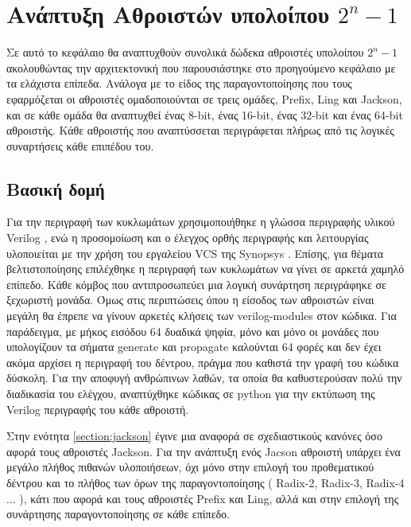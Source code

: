 \section{Ανάπτυξη Αθροιστών υπολοίπου $2^n-1$ }

Σε αυτό το κεφάλαιο θα αναπτυχθούν συνολικά δώδεκα αθροιστές υπολοίπου $2^n-1$
ακολουθώντας την αρχιτεκτονική που παρουσιάστηκε στο προηγούμενο κεφάλαιο 
με τα ελάχιστα επίπεδα. Ανάλογα με το είδος της παραγοντοποίησης που τους εφαρμόζεται 
οι αθροιστές ομαδοποιούνται σε τρεις ομάδες, Prefix, Ling και Jackson,
και σε κάθε ομάδα θα αναπτυχθεί ένας 8-bit, ένας 16-bit, ένας 32-bit και ένας 64-bit 
αθροιστής. Κάθε αθροιστής που αναπτύσσεται περιγράφεται πλήρως από τις λογικές 
συναρτήσεις κάθε επιπέδου του.






\subsection{Βασική δομή}
Για την περιγραφή των κυκλωμάτων χρησιμοποιήθηκε η γλώσσα περιγραφής υλικού Verilog \cite{1620780}, ενώ η προσομοίωση και ο έλεγχος ορθής περιγραφής και λειτουργίας υλοποιείται
με την χρήση του εργαλείου VCS της Synopsys \cite{vcs-synopsys}. Επίσης, για θέματα
βελτιστοποίησης επιλέχθηκε η περιγραφή των κυκλωμάτων να γίνει σε αρκετά χαμηλό επίπεδο. Κάθε
κόμβος που αντιπροσωπεύει μια λογική συνάρτηση περιγράφηκε σε ξεχωριστή μονάδα. Όμως στις 
περιπτώσεις όπου η είσοδος των αθροιστών είναι μεγάλη θα έπρεπε να γίνουν αρκετές κλήσεις των 
verilog-modules στον κώδικα. Για παράδειγμα, με μήκος εισόδου 64 δυαδικά ψηφία, μόνο και μόνο οι 
μονάδες που υπολογίζουν τα σήματα generate και propagate καλούνται 64 φορές και δεν
έχει ακόμα αρχίσει η περιγραφή του δέντρου, πράγμα που καθιστά την γραφή του κώδικα 
δύσκολη. Για την αποφυγή ανθρώπινων λαθών, τα οποία θα καθυστερούσαν πολύ την 
διαδικασία του ελέγχου, αναπτύχθηκε κώδικας σε python για την εκτύπωση της Verilog
περιγραφής του κάθε αθροιστή.

Στην ενότητα \ref{section:jackson} έγινε μια αναφορά σε σχεδιαστικούς κανόνες όσο αφορά τους 
αθροιστές Jackson. Για την ανάπτυξη ενός Jacson αθροιστή υπάρχει ένα μεγάλο πλήθος πιθανών υλοποιήσεων,
όχι μόνο στην επιλογή του προθεματικού δέντρου και το πλήθος των όρων της παραγοντοποίησης ( Radix-2, 
Radix-3, Radix-4 ... ), κάτι που αφορά και τους αθροιστές Prefix και Ling, αλλά 
και στην επιλογή της συνάρτησης παραγοντοποίησης σε κάθε επίπεδο.


